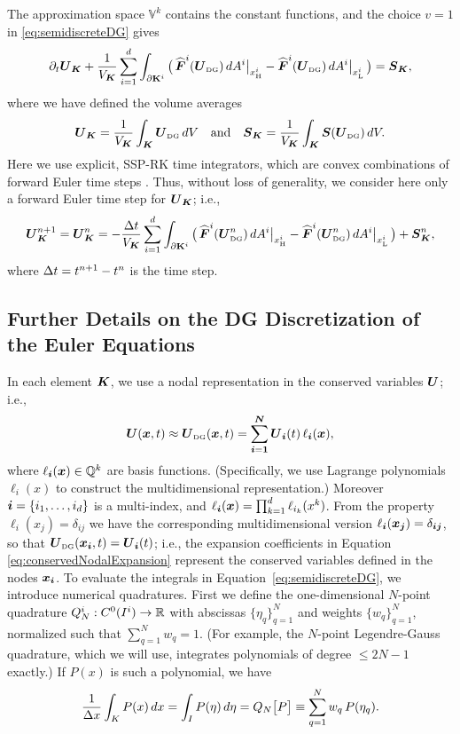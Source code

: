 \documentclass[10pt,preprint]{aastex}
\newcommand{\pbK}{\partial\mathbf{K}}
\newcommand{\UDG}{\bU_{\mbox{\tiny DG}}}
\newcommand{\sumx}{\sum_{i=1}^{d}}
\begin{document}
The approximation space $\mathbb{V}^{k}$ contains the constant functions, and the choice $v=1$ in \eqref{eq:semidiscreteDG} gives
\begin{equation}
  \partial_{t}\bU_{\bK}
  +\f{1}{V_{\bK}}\sumx\int_{\pbK^{i}}\big(\,\widehat{\vect{F}}^{i}(\UDG)\,dA^{i}\big|_{\xH^{i}}-\widehat{\vect{F}}^{i}(\UDG)\,dA^{i}\big|_{\xL^{i}}\,\big)
  =\bS_{\bK},
\end{equation}
where we have defined the volume averages
\begin{equation}
  \bU_{\bK}=\f{1}{V_{\bK}}\int_{\bK}\UDG\,dV \quad\text{and}\quad
  \bS_{\bK}=\f{1}{V_{\bK}}\int_{\bK}\vect{S}(\UDG)\,dV.  
\end{equation}
Here we use explicit, SSP-RK time integrators, which are convex combinations of forward Euler time steps \citep{gottlieb_etal_2001}.  
Thus, without loss of generality, we consider here only a forward Euler time step for $\boldsymbol{U}_{\boldsymbol{K}}$; i.e., 
\begin{equation}
  \bU_{\bK}^{n+1}=\bU_{\bK}^{n}
  =-\f{\dt}{V_{\bK}}\sumx\int_{\pbK^{i}}\big(\,\widehat{\vect{F}}^{i}(\UDG^{n})\,dA^{i}\big|_{\xH^{i}}-\widehat{\vect{F}}^{i}(\UDG^{n})\,dA^{i}\big|_{\xL^{i}}\,\big)
  +\vect{S}_{\bK}^{n},
\end{equation}
where $\Delta t=t^{n+1}-t^{n}$ is the time step.  

\subsection{Further Details on the DG Discretization of the Euler Equations}

In each element $\boldsymbol{K}$, we use a nodal representation in the conserved variables $\boldsymbol{U}$; i.e.,
\begin{equation}
  \boldsymbol{U}(\boldsymbol{x},t)\approx
  \boldsymbol{U}_{\mbox{\tiny DG}}(\boldsymbol{x},t)=\sum_{\boldsymbol{i}=\boldsymbol{1}}^{\boldsymbol{N}}\boldsymbol{U}_{\boldsymbol{i}}(t)\,\ell_{\boldsymbol{i}}(\boldsymbol{x}),
  \label{eq:conservedNodalExpansion}
\end{equation}
where $\ell_{\boldsymbol{i}}(\boldsymbol{x})\in\mathbb{Q}^{k}$ are basis functions.  
(Specifically, we use Lagrange polynomials $\ell_{i}(x)$ to construct the multidimensional representation.)  
Moreover $\boldsymbol{i}=\{i_{1},\ldots,i_{d}\}$ is a multi-index, and $\ell_{\boldsymbol{i}}(\boldsymbol{x})=\prod_{k=1}^{d}\ell_{i_{k}}(x^{k})$.  
From the property $\ell_{i}(x_{j})=\delta_{ij}$ we have the corresponding multidimensional version $\ell_{\boldsymbol{i}}(\boldsymbol{x}_{\boldsymbol{j}})=\delta_{\boldsymbol{i}\boldsymbol{j}}$, so that $\boldsymbol{U}_{\mbox{\tiny DG}}(\boldsymbol{x}_{\boldsymbol{i}},t)=\boldsymbol{U}_{\boldsymbol{i}}(t)$; i.e., the expansion coefficients in Equation \eqref{eq:conservedNodalExpansion} represent the conserved variables defined in the nodes $\boldsymbol{x}_{\boldsymbol{i}}$.  
To evaluate the integrals in Equation~\eqref{eq:semidiscreteDG}, we introduce numerical quadratures.  
First we define the one-dimensional $N$-point quadrature $Q_{N}^{i}:C^{0}(I^{i})\to\mathbb{R}$ with abscissas $\{\eta_{q}\}_{q=1}^{N}$ and weights $\{w_{q}\}_{q=1}^{N}$, normalized such that $\sum_{q=1}^{N}w_{q}=1$.  
(For example, the $N$-point Legendre-Gauss quadrature, which we will use, integrates polynomials of degree $\le 2N-1$ exactly.)
If $P(x)$ is such a polynomial, we have
\begin{equation}
  \frac{1}{\Delta x}\int_{K}P(x)\,dx=\int_{I}P(\eta)\,d\eta=Q_{N}\big[P\big]\equiv\sum_{q=1}^{N}w_{q}\,P(\eta_{q}).  
\end{equation}
\end{document}

